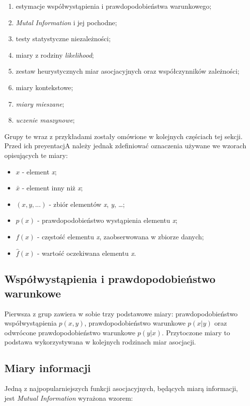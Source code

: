 \begin{enumerate}
	\item estymacje współwystąpienia i prawdopodobieństwa warunkowego;
	\item \emph{Mutal Information} i jej pochodne;
	\item testy statystyczne niezależności;
	\item miary z rodziny \emph{likelihood};
	\item zestaw heurystycznych miar asocjacyjnych oraz współczynników zależności;
	\item miary kontekstowe;
	\item \emph{miary mieszane};
	\item \emph{uczenie maszynowe};
\end{enumerate}

Grupy te wraz z przykładami zostały omówione w kolejnych częściach tej sekcji.
Przed ich preyentacjA należy jednak zdefiniować oznaczenia używane we wzorach opisujących te miary:

\begin{itemize}
	\item $ x $ - element \emph{x};
	\item $ \bar{x} $ - element inny niż \emph{x};
	\item $ (x, y, ...) $ - zbiór elementów \emph{x}, \emph{y}, \ldots;
	\item $ p(x) $ - prawdopodobieństwo wystąpienia elementu \emph{x};
	\item $ f(x) $ - częstość elementu \emph{x}, zaobserwowana w zbiorze danych;
	\item $ \hat{f}(x) $ - wartość oczekiwana elementu \emph{x}.
\end{itemize}


\subsection{Współwystąpienia i prawdopodobieństwo warunkowe}
Pierwsza z grup zawiera w sobie trzy podstawowe miary: prawdopodobieństwo współwystąpienia $ p(x, y) $, prawdopodobieństwo warunkowe $ p(x|y) $ oraz odwrócone prawdopodobieństwo warunkowe $ p(y|x) $.
Przytoczone miary to podstawa wykorzystywana w kolejnych rodzinach miar asocjacji.

\subsection{Miary informacji}
Jedną z najpopularniejszych funkcji asocjacyjnych, będących miarą informacji, jest \emph{Mutual Information} wyrażona wzorem\cite[str. 2]{mmi_w11}:

